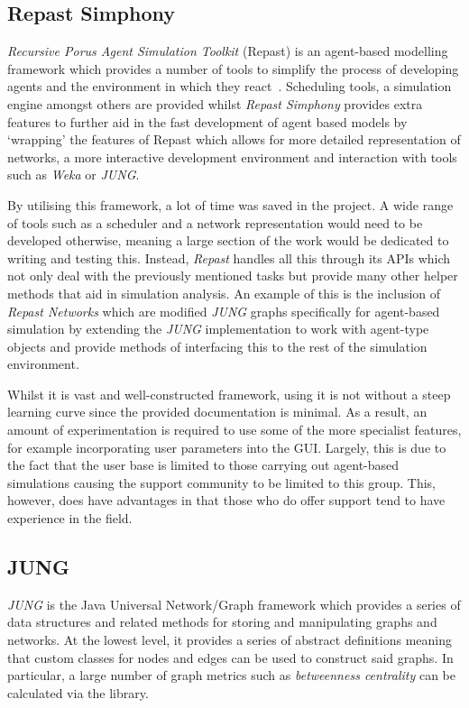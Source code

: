 \documentclass[]{report}
\begin{document}
\subsection{Repast Simphony}
\emph{Recursive Porus Agent Simulation Toolkit} (Repast) is an agent-based modelling framework which provides a number of tools to simplify the process of developing agents and the environment in which they react~\cite{repast-main}. Scheduling tools, a simulation engine amongst others are provided whilst \emph{Repast Simphony} provides extra features to further aid in the fast development of agent based models by `wrapping' the features of Repast which allows for more detailed representation of networks, a more interactive development environment and interaction with tools such as \emph{Weka} or \emph{JUNG}.

By utilising this framework, a lot of time was saved in the project. A wide range of tools such as a scheduler and a network representation would need to be developed otherwise, meaning a large section of the work would be dedicated to writing and testing this. Instead, \emph{Repast} handles all this through its APIs which not only deal with the previously mentioned tasks but provide many other helper methods that aid in simulation analysis. An example of this is the inclusion of \emph{Repast Networks} which are modified \emph{JUNG} graphs specifically for agent-based simulation by extending the \emph{JUNG} implementation to work with agent-type objects and provide methods of interfacing this to the rest of the simulation environment.

Whilst it is vast and well-constructed framework, using it is not without a steep learning curve since the provided documentation is minimal. As a result, an amount of experimentation is required to use some of the more specialist features, for example incorporating user parameters into the GUI. Largely, this is due to the fact that the user base is limited to those carrying out agent-based simulations causing the support community to be limited to this group. This, however, does have advantages in that those who do offer support tend to have experience in the field. 

\subsection{JUNG}
\emph{JUNG} is the Java Universal Network/Graph framework which provides a series of data structures and related methods for storing and manipulating graphs and networks. At the lowest level, it provides a series of abstract definitions meaning that custom classes for nodes and edges can be used to construct said graphs. In particular, a large number of graph metrics such as \emph{betweenness centrality} can be calculated via the library.
\end{document}
